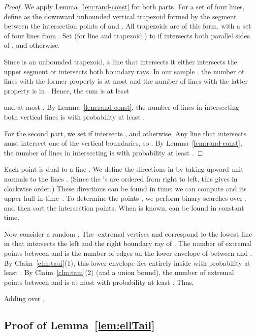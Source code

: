 \documentclass[letterpaper,11pt]{article}
\begin{document}
\begin{proof} 
We apply Lemma~\ref{lem:rand-const} 
for both parts.
For a set  
of four lines,
define  as the downward 
unbounded vertical trapezoid formed by 
the segment between the intersection
points of  and 
. 
All trapezoids  
are of this form, with 
a set of four lines from .
Set  (for line  
and trapezoid )
to  if  intersects both 
parallel sides of , and  otherwise.

Since  is an unbounded
trapezoid, a line that 
intersects it either 
intersects the upper segment
or intersects both boundary rays. 
In our sample , the number 
of lines with the former
property is at most 
and the number of lines with 
the latter property is in 
.
Hence, the sum 
 is at least 
 
and at most .
By Lemma~\ref{lem:rand-const}, 
the number of lines in  intersecting
both vertical lines is 
 with probability 
at least 
.

For the second part, we 
set  
if  
intersects , and  otherwise. 
Any line that intersects 
must intersect one of the 
vertical boundaries,
so 
.
By Lemma~\ref{lem:rand-const}, 
the number of lines in  intersecting
 is  
with probability at least .
\end{proof}

Each point  is dual 
to a line . We define the
directions in  by 
taking upward unit normals to 
the lines .  (Since the 's 
are ordered from right to left, this 
gives  in clockwise order.)
These directions can 
be found in 
time: we can compute  
and its upper hull  in  
time~\cite{ColeShYa87,Dey98}.
To determine the points , 
we perform  binary searches over
, and then sort the intersection points. 
When  is
known,  can be found 
in constant time.

Now consider a random . 
The -extremal 
vertices  and  
correspond to the lowest line in 
 that intersects the left and the
right boundary ray of . 
The number of extremal points between
 and  is the number of edges 
on the lower envelope
of  between  and 
. By Claim~\ref{clm:taui}(1),
this lower envelope lies entirely 
inside  with probability
at least . 
By Claim~\ref{clm:taui}(2) 
(and a union bound), the number  of
extremal points between  and
 is at most  
with probability at least .
Thus, 

Adding over , 


\subsection{Proof of Lemma~\ref{lem:ellTail}}\label{sec:ellTail}
\end{document}
